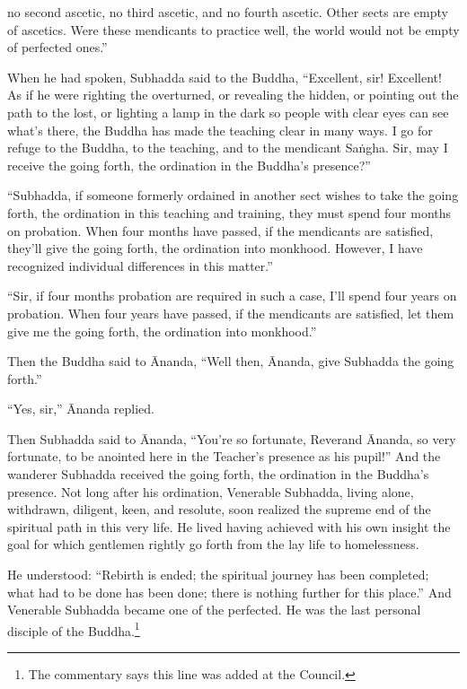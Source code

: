 \documentclass[12pt,openany]{book}%
\begin{document}
no second ascetic, no third ascetic, and no fourth ascetic. Other sects are empty of ascetics. Were these mendicants to practice well, the world would not be empty of perfected ones.” 

When he had spoken, Subhadda said to the Buddha, “Excellent, sir! Excellent! As if he were righting the overturned, or revealing the hidden, or pointing out the path to the lost, or lighting a lamp in the dark so people with clear eyes can see what’s there, the Buddha has made the teaching clear in many ways. I go for refuge to the Buddha, to the teaching, and to the mendicant \textsanskrit{Saṅgha}. Sir, may I receive the going forth, the ordination in the Buddha’s presence?” 

“Subhadda, if someone formerly ordained in another sect wishes to take the going forth, the ordination in this teaching and training, they must spend four months on probation. When four months have passed, if the mendicants are satisfied, they’ll give the going forth, the ordination into monkhood. However, I have recognized individual differences in this matter.” 

“Sir, if four months probation are required in such a case, I’ll spend four years on probation. When four years have passed, if the mendicants are satisfied, let them give me the going forth, the ordination into monkhood.” 

Then the Buddha said to Ānanda, “Well then, Ānanda, give Subhadda the going forth.” 

“Yes, sir,” Ānanda replied. 

Then Subhadda said to Ānanda, “You’re so fortunate, Reverand Ānanda, so very fortunate, to be anointed here in the Teacher’s presence as his pupil!” And the wanderer Subhadda received the going forth, the ordination in the Buddha’s presence. Not long after his ordination, Venerable Subhadda, living alone, withdrawn, diligent, keen, and resolute, soon realized the supreme end of the spiritual path in this very life. He lived having achieved with his own insight the goal for which gentlemen rightly go forth from the lay life to homelessness. 

He understood: “Rebirth is ended; the spiritual journey has been completed; what had to be done has been done; there is nothing further for this place.” And Venerable Subhadda became one of the perfected. He was the last personal disciple of the Buddha.\footnote{The commentary says this line was added at the Council. } 
\end{document}
